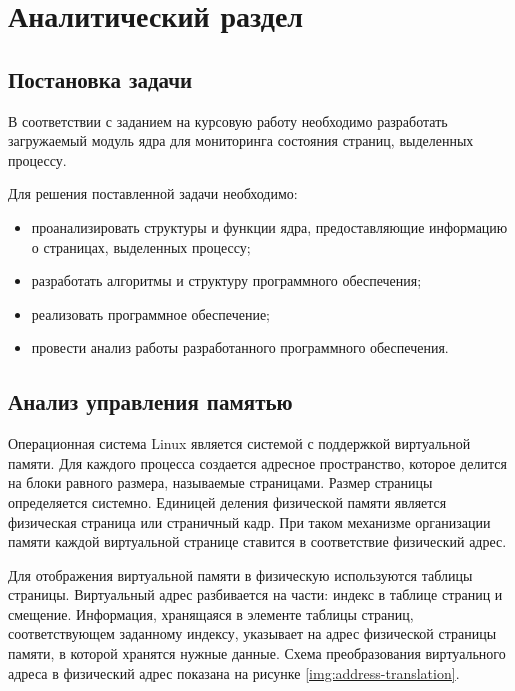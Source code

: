 \chapter{Аналитический раздел}

\section{Постановка задачи}

В соответствии с заданием на курсовую работу необходимо разработать загружаемый модуль ядра для мониторинга состояния страниц, выделенных процессу.

Для решения поставленной задачи необходимо:

\begin{itemize}
	\item проанализировать структуры и функции ядра, предоставляющие информацию о страницах, выделенных процессу;
	\item разработать алгоритмы и структуру программного обеспечения;
	\item реализовать программное обеспечение;
	\item провести анализ работы разработанного программного обеспечения.
\end{itemize}

\section{Анализ управления памятью}

Операционная система Linux является системой с поддержкой виртуальной памяти. Для каждого процесса создается адресное пространство, которое делится на блоки равного размера, называемые страницами. Размер страницы определяется системно. Единицей деления физической памяти является физическая страница или страничный кадр. При таком механизме организации памяти каждой виртуальной странице ставится в соответствие физический адрес.

Для отображения виртуальной памяти в физическую используются таблицы страницы. Виртуальный адрес разбивается на части: индекс в таблице страниц и смещение. Информация, хранящаяся в элементе таблицы страниц, соответствующем заданному индексу, указывает на адрес физической страницы памяти, в которой хранятся нужные данные. Схема преобразования виртуального адреса в физический адрес показана на рисунке \ref{img:address-translation}.

